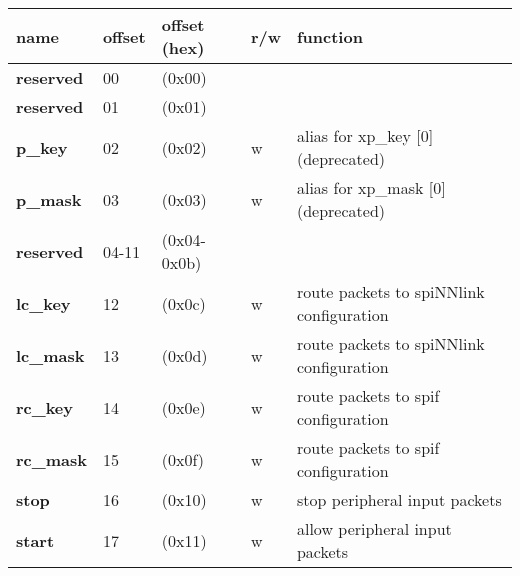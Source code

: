 \documentclass[11pt,a4paper,twoside]{article}
\begin{document}
\begin{center}
	\begin{table}[!h]
		\begin{tabularx}{\textwidth}{| p{30mm} p{13mm} p{21mm} p{7mm} X |}
			\hline
			\textbf{name}                        & \textbf{offset}           & \textbf{offset} (hex)           & \textbf{r/w}        & \textbf{function} \\%
			\hline
			\hline
			\cellcolor{gray!25}\textbf{reserved} & \cellcolor{gray!25}00     & \cellcolor{gray!25}(0x00)       & \cellcolor{gray!25} & \cellcolor{gray!25}\\%
			\cellcolor{gray!25}\textbf{reserved} & \cellcolor{gray!25}01     & \cellcolor{gray!25}(0x01)       & \cellcolor{gray!25} & \cellcolor{gray!25}\\%
			\cellcolor{pink!25}\textbf{p\_key}   & \cellcolor{pink!25}02     & \cellcolor{pink!25}(0x02)       & \cellcolor{pink!25}w& \cellcolor{pink!25}alias for xp\_key [0] (deprecated)  \\%
			\cellcolor{pink!25}\textbf{p\_mask}  & \cellcolor{pink!25}03     & \cellcolor{pink!25}(0x03)       & \cellcolor{pink!25}w& \cellcolor{pink!25}alias for xp\_mask [0] (deprecated) \\%
			\cellcolor{gray!25}\textbf{reserved} & \cellcolor{gray!25}04-11  & \cellcolor{gray!25} (0x04-0x0b) & \cellcolor{gray!25} & \cellcolor{gray!25}\\%
			\textbf{lc\_key}                     & 12                        & (0x0c)                          & w                   & \small{route packets to spiNNlink configuration} \\%
			\textbf{lc\_mask}                    & 13                        & (0x0d)                          & w                   & \small{route packets to spiNNlink configuration} \\%
			\textbf{rc\_key}                     & 14                        & (0x0e)                          & w                   & route packets to spif configuration   \\%
			\textbf{rc\_mask}                    & 15                        & (0x0f)                          & w                   & route packets to spif configuration   \\%
			\textbf{stop}                        & 16                        & (0x10)                          & w                   & stop peripheral input packets         \\%
			\textbf{start}                       & 17                        & (0x11)                          & w                   & allow peripheral input packets         \\%

\end{tabularx}
\end{table}
\end{center}
\end{document}
